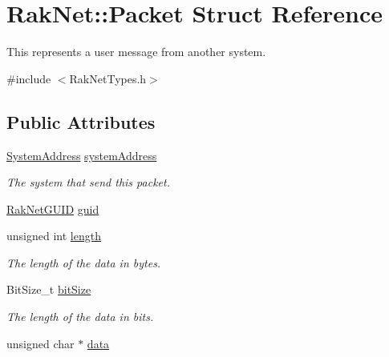 \hypertarget{struct_rak_net_1_1_packet}{\section{Rak\-Net\-:\-:Packet Struct Reference}
\label{struct_rak_net_1_1_packet}
}


This represents a user message from another system.  




{\ttfamily \#include $<$Rak\-Net\-Types.\-h$>$}

\subsection*{Public Attributes}
\begin{DoxyCompactItemize}
\item 
\hypertarget{struct_rak_net_1_1_packet_abf432112847cb3ce458935b8a5ae4089}{\hyperlink{struct_rak_net_1_1_system_address}{System\-Address} \hyperlink{struct_rak_net_1_1_packet_abf432112847cb3ce458935b8a5ae4089}{system\-Address}}\label{struct_rak_net_1_1_packet_abf432112847cb3ce458935b8a5ae4089}

\begin{DoxyCompactList}\small\item\em The system that send this packet. \end{DoxyCompactList}\item 
\hyperlink{struct_rak_net_1_1_rak_net_g_u_i_d}{Rak\-Net\-G\-U\-I\-D} \hyperlink{struct_rak_net_1_1_packet_ac6df86ad7879c10dc1ac0624d5c7b329}{guid}
\item 
\hypertarget{struct_rak_net_1_1_packet_a114883d23f7133c77808651a33420d0f}{unsigned int \hyperlink{struct_rak_net_1_1_packet_a114883d23f7133c77808651a33420d0f}{length}}\label{struct_rak_net_1_1_packet_a114883d23f7133c77808651a33420d0f}

\begin{DoxyCompactList}\small\item\em The length of the data in bytes. \end{DoxyCompactList}\item 
\hypertarget{struct_rak_net_1_1_packet_a73f9372a0bc806574ae31bad3a38412a}{Bit\-Size\-\_\-t \hyperlink{struct_rak_net_1_1_packet_a73f9372a0bc806574ae31bad3a38412a}{bit\-Size}}\label{struct_rak_net_1_1_packet_a73f9372a0bc806574ae31bad3a38412a}

\begin{DoxyCompactList}\small\item\em The length of the data in bits. \end{DoxyCompactList}\item 
\hypertarget{struct_rak_net_1_1_packet_a63e46b85c8ca156b205a124e54659614}{unsigned char $\ast$ \hyperlink{struct_rak_net_1_1_packet_a63e46b85c8ca156b205a124e54659614}{data}}\label{struct_rak_net_1_1_packet_a63e46b85c8ca156b205a124e54659614}


\end{DoxyCompactItemize}
